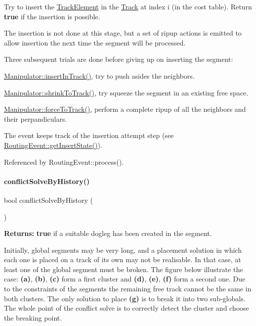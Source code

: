 Try to insert the \hyperlink{classKite_1_1TrackElement}{Track\+Element} in the \hyperlink{classKite_1_1Track}{Track} at index {\ttfamily i} (in the cost table). Return {\bfseries true} if the insertion is possible.

The insertion is not done at this stage, but a set of ripup actions is emitted to allow insertion the next time the segment will be processed.

Three subsequent trials are done before giving up on inserting the segment\+:
\begin{DoxyEnumerate}
\item \hyperlink{classKite_1_1Manipulator_a7140b507da2cab137d968a037bed19df}{Manipulator\+::insert\+In\+Track()}, try to push asides the neighbors.
\item \hyperlink{classKite_1_1Manipulator_aba69c61ccb330e26aaa8211f0454795f}{Manipulator\+::shrink\+To\+Track()}, try squeeze the segment in an existing free space.
\item \hyperlink{classKite_1_1Manipulator_a76d3956660cfa624696e2a5f2916cd22}{Manipulator\+::force\+To\+Track()}, perform a complete ripup of all the neighbors and their perpandiculars.
\end{DoxyEnumerate}

The event keeps track of the insertion attempt step (see \hyperlink{classKite_1_1RoutingEvent_a00f02910915e7deb857f023e5d584c08}{Routing\+Event\+::get\+Insert\+State()}). 

Referenced by Routing\+Event\+::process().

\mbox{\label{classKite_1_1SegmentFsm_a0d9a9926ae67cc7998799347f135e28a}} 
\paragraph{\texorpdfstring{conflict\+Solve\+By\+History()}{conflictSolveByHistory()}}
{\footnotesize\ttfamily bool conflict\+Solve\+By\+History (\begin{DoxyParamCaption}{ }\end{DoxyParamCaption})}

{\bfseries Returns\+:} {\bfseries true} if a suitable dogleg has been created in the segment.

Initially, global segments may be very long, and a placement solution in which each one is placed on a track of it\textquotesingle{}s own may not be realisable. In that case, at least one of the global segment must be broken. The figure below illustrate the case\+: {\bfseries (a)}, {\bfseries (b)}, {\bfseries (c)} form a first cluster and {\bfseries (d)}, {\bfseries (e)}, {\bfseries (f)} form a second one. Due to the constraints of the segments the remaining free track cannot be the same in both clusters. The only solution to place {\bfseries (g)} is to break it into two sub-\/globals. The whole point of the conflict solve is to correctly detect the cluster and choose the breaking point.

